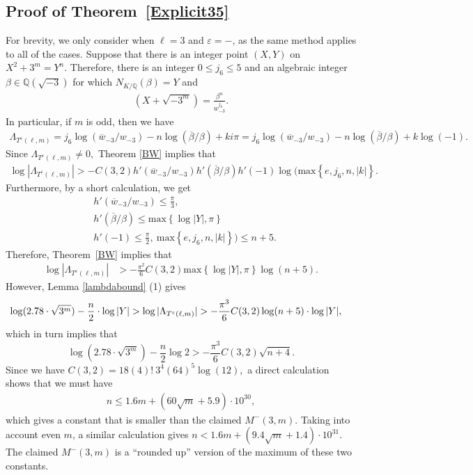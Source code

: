 \documentclass[12pt]{amsart}
\newcommand{\Q}{\mathbb{Q}}
\newcommand{\?}{\color{red}?}
\numberwithin{equation}{section}
\begin{document}
\subsection{Proof of Theorem~\ref{Explicit35}}
For brevity, we only consider  when $\ell=3$ and $\varepsilon=-$,  as  the same method applies to all of the cases.
Suppose that there is an integer point $(X,Y)$ on $X^2+3^m=Y^n$.
Therefore, there is an integer $0\leq j_6\leq 5$ and an algebraic integer $\beta \in \Q(\sqrt{-3})$ for which
$N_{K/\Q}(\beta)=Y$ and
\begin{align*}
    (X+\sqrt{-3^m})=\frac{\beta^n}{w_{-3}^{j_6}}.
\end{align*}
In particular, if $m$ is odd, then we have
\begin{align*}
    \Lambda_{T^{\varepsilon}(\ell,m)}=j_6\log({\overline{w}_{-3}}/ w_{-3})-n\log({\overline{\beta}}/\beta)+ki\pi
    =j_6\log({\overline{w}_{-3}}/ w_{-3})-n\log({\overline{\beta}}/\beta)+k\log(-1).
\end{align*}
Since $\Lambda_{T^{\varepsilon}(\ell,m)}\neq 0,$ Theorem \ref{BW} implies that
\begin{align*}
    \log|\Lambda_{T^{\varepsilon}(\ell,m)}|>-C(3,2)h'(\overline{w}_{-3}/w_{-3})h'(\overline{\beta}/\beta)h'(-1)\log(\mathrm{max}\left\{e,j_6,n,|k|\right\}.
\end{align*}
Furthermore, by a short calculation, we get
\begin{displaymath}
\begin{split}
&h'(\overline{w}_{-3}/w_{-3})\leq\frac{\pi}{3},\\
 &h'(\overline{\beta}/\beta)\leq\mathrm{max}\left\{\log |Y|, \pi\right\}\\
 &h'(-1)\leq\frac{\pi}{2},~\mathrm{max}\left\{e,j_6,n,|k|\right\})\leq n+5.
\end{split}
\end{displaymath}
Therefore, Theorem~\ref{BW} implies that
\begin{align*}
     \log|\Lambda_{T^{\varepsilon}(\ell,m)}|&>-\frac{\pi^2}{6}C(3,2)\mathrm{max}\left\{\log |Y|, \pi\right\}\log(n+5).
\end{align*}
However, Lemma \ref{lambdabound} (1) gives
\begin{align*}
 \log(2.78\cdot\sqrt{3^m})-\frac{n}{2}\cdot {\color{black}\log |Y|} >\log|\Lambda_{T^{\varepsilon}(\ell,m)}|&>-\frac{\pi^3}{6}C(3,2)\log(n+5)\cdot {\color{black}\log |Y|},
\end{align*}
which in turn implies that
$$
    \log(2.78\cdot\sqrt{3^m})-\frac{n}{2}\log 2  >-\frac{\pi^3}{6}C(3,2)\sqrt{n+4}.
$$
Since we have $C(3,2)=18(4)!~3^4(6
4)^5\log(12),$ a direct calculation shows that we must have
\begin{align*}
    n\leq 1.6m+(60\sqrt{m}+5.9)\cdot 10^{30},
  \end{align*}
which gives a constant that is smaller than the claimed $M^{-}(3,m).$ Taking into account even $m$,
a similar calculation gives $n< 1.6m +(9.4\sqrt{m}+1.4)\cdot 10^{31}.$ The claimed $M^{-}(3,m)$ is
a ``rounded up'' version of the maximum of these two constants.
\end{document}
